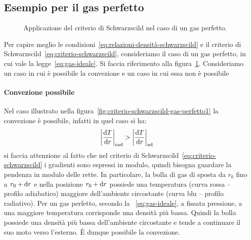 \subsection{Esempio per il gas perfetto}
\begin{figure}
\centering
{} \qquad
{} 
\caption{Applicazione del criterio di Schwarzscild nel caso di un gas perfetto.}
\label{fig:criterio-schwarzscild-gas-perfetto}
\end{figure}

Per capire meglio le condizioni~\eqref{eq:relazioni-densità-schwarzscild} e il criterio di Schwarzscild~\eqref{eq:criterio-schwarzscild}, consideriamo il caso di un gas perfetto, in cui vale la legge~\eqref{eq:gas-ideale}. Si faccia riferimento alla figura~\ref{fig:criterio-schwarzscild-gas-perfetto}. Consideriamo un caso in cui è possibile la convezione e un caso in cui essa non è possibile

\paragraph{Convezione possibile}
Nel caso illustrato nella figura~\ref{fig:criterio-schwarzscild-gas-perfetto1} la convezione è possibile, infatti in quel caso si ha:
\[
\abs*{\dfrac{\ud T}{\ud r}}_\textup{rad} > \abs*{\dfrac{\ud T}{\ud r}}_\textup{ad}
\]
si faccia attenzione al fatto che nel criterio di Schwarzscild~\eqref{eq:criterio-schwarzscild} i gradienti sono espressi in modulo, quindi bisogna guardare la pendenza in modulo delle rette. In particolare, la bolla di gas di sposta da $r_0$ fino a $r_0 + \ud r$ e nella posizione $r_0 + \ud r$ possiede una temperatura (curva rossa -- profilo adiabatico) maggiore dell'ambiente circostante (curva blu -- profilo radiativo). Per un gas perfetto, secondo la ~\eqref{eq:gas-ideale}, a fissata pressione, a una maggiore temperatura corrisponde una densità più bassa. Quindi la bolla possiede una densità più bassa dell'ambiente circostante e tende a continuare il suo moto verso l'esterno. È dunque possibile la convezione.

